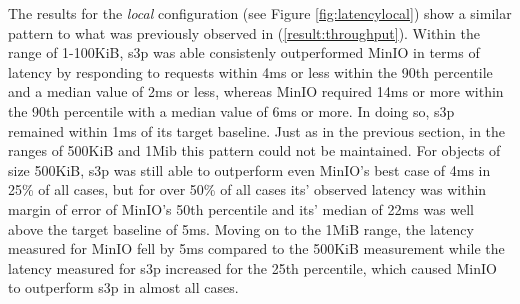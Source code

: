 The results for the \textit{local} configuration (see Figure \ref{fig:latencylocal}) show a similar pattern to what was previously observed in (\ref{result:throughput}).
Within the range of 1-100KiB, s3p was able consistenly outperformed MinIO in terms of latency by responding to requests within 4ms or less within the 90th percentile and a median value of 2ms or less, whereas MinIO required 14ms or more within the 90th percentile with a median value of 6ms or more. In doing so, s3p remained within 1ms of its target baseline.
Just as in the previous section, in the ranges of 500KiB and 1Mib this pattern could not be maintained. For objects of size 500KiB, s3p was still able to outperform even MinIO's best case of 4ms in 25\% of all cases, but for over 50\% of all cases its' observed latency was within margin of error of MinIO's 50th percentile and its' median of 22ms was well above the target baseline of 5ms.
Moving on to the 1MiB range, the latency measured for MinIO fell by 5ms compared to the 500KiB measurement while the latency measured for s3p increased for the 25th percentile, which caused MinIO to outperform s3p in almost all cases.
\\\\
